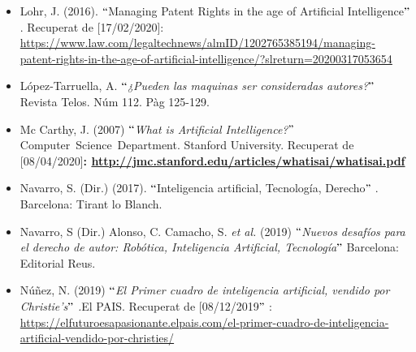 \documentclass[12pt]{article}
\begin{document}
\begin{itemize}
\vspace{\baselineskip}
	\item Lohr, J. (2016). $``$Managing Patent Rights in the age of Artificial Intelligence$"$ . Recuperat de [17/02/2020]: \href{https://www.law.com/legaltechnews/almID/1202765385194/managing-patent-rights-in-the-age-of-artificial-intelligence/?slreturn=20200317053654}{https://www.law.com/legaltechnews/almID/1202765385194/managing-patent-rights-in-the-age-of-artificial-intelligence/?slreturn=20200317053654}\par


\vspace{\baselineskip}
	\item López-Tarruella, A. \textit{$``$¿Pueden las maquinas ser consideradas autores?}$"$  Revista Telos. Núm 112. Pàg 125-129.\par


\vspace{\baselineskip}
	\item Mc Carthy, J. (2007)\textit{ $``$What is Artificial Intelligence?$"$  }Computer\ Science\ Department. Stanford University.   Recuperat de [08/04/2020]\textbf{:\textit{ \href{http://jmc.stanford.edu/articles/whatisai/whatisai.pdf}{}}\textcolor[HTML]{0000FF}{\ul{http://jmc.stanford.edu/articles/whatisai/whatisai.pdf}}}\par


\vspace{\baselineskip}
	\item Navarro, S. (Dir.) (2017). $``$Inteligencia artificial, Tecnología, Derecho$"$ . Barcelona: Tirant lo Blanch.\par


\vspace{\baselineskip}
	\item Navarro, S (Dir.) Alonso, C. Camacho, S. \textit{et al.} (2019) $``$\textit{Nuevos desafíos para el derecho de autor: Robótica, Inteligencia Artificial, Tecnología$"$  }Barcelona: Editorial Reus.\par


\vspace{\baselineskip}
	\item Núñez, N. (2019) $``$\textit{El Primer cuadro de inteligencia artificial, vendido por Christie’s$"$ .}El PAIS. Recuperat de [08/12/2019$"$ : \href{https://elfuturoesapasionante.elpais.com/el-primer-cuadro-de-inteligencia-artificial-vendido-por-christies/}{https://elfuturoesapasionante.elpais.com/el-primer-cuadro-de-inteligencia-artificial-vendido-por-christies/}\par



\end{itemize}
\end{document}

